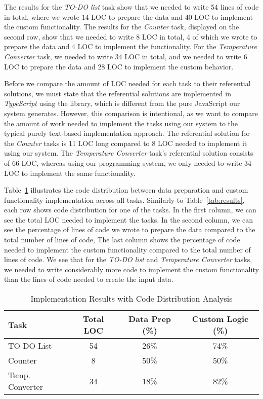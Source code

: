 The results for the \emph{TO-DO list} task show that we needed to write 54 lines of code in total, where we wrote 14 LOC to prepare the data and 40 LOC to implement the custom functionality.
The results for the \emph{Counter} task, displayed on the second row, show that we needed to write 8 LOC in total, 4 of which we wrote to prepare the data and 4 LOC to implement the functionality.
For the \emph{Temperature Converter} task, we needed to write 34 LOC in total, and we needed to write 6 LOC to prepare the data and 28 LOC to implement the custom behavior.

Before we compare the amount of LOC needed for each task to their referential solutions, we must state that the referential solutions are implemented in \emph{TypeScript} using the \citet{react} library,
which is different from the pure JavaScript our system generates.
However, this comparison is intentional, as we want to compare the amount of work needed to implement the tasks using our system to the typical purely text-based implementation approach.
The referential solution for the \emph{Counter} tasks is 11 LOC long compared to 8 LOC needed to implement it using our system.
The \emph{Temperature Converter} task's referential solution consists of 66 LOC, whereas using our programming system, we only needed to write 34 LOC to implement the same functionality.


Table~\ref{tab:results-percentages} illustrates the code distribution between data preparation and custom functionality implementation across all tasks.
Similarly to Table~\ref{tab:results}, each row shows code distribution for one of the tasks.
In the first column, we can see the total LOC needed to implement the tasks.
In the second column, we can see the percentage of lines of code we wrote to prepare the data compared to the total number of lines of code,
The last column shows the percentage of code needed to implement the custom functionality compared to the total number of lines of code.
We see that for the \emph{TO-DO list} and \emph{Temperature Converter} tasks, we needed to write considerably more code to implement the custom functionality than the lines of code needed to create the input data.

\begin{table}[htpb]
	\centering
	\begin{tabular}{|p{3cm}|c|c|c|}
		\hline
		\textbf{Task}   & \textbf{Total LOC} & \textbf{Data Prep (\%)} & \textbf{Custom Logic (\%)} \\
		\hline
		TO-DO List      & 54                 & 26\%                    & 74\%                       \\
		Counter         & 8                  & 50\%                    & 50\%                       \\
		Temp. Converter & 34                 & 18\%                    & 82\%                       \\
		\hline
	\end{tabular}
	\caption{Implementation Results with Code Distribution Analysis}
	\label{tab:results-percentages}
\end{table}

